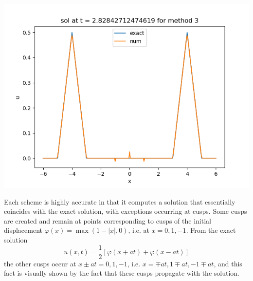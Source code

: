\documentclass{article}
\newcommand{\vp}{\varphi}
\begin{document}
\begin{enumerate}[label=(\alph*)]
\begin{center}
	\includegraphics[scale=.4]{hw11 sol n = 80 method 3}
\end{center}

Each scheme is highly accurate in that it computes a solution that essentially coincides with the exact solution, with exceptions occurring at cusps. Some cusps are created and remain at points corresponding to cusps of the initial displacement $\vp(x)=\max(1-|x|,0)$, i.e. at $x=0,1,-1$. From the exact solution
$$u(x,t) = \frac12[\vp(x+at)+\vp(x-at)]$$
the other cusps occur at $x\pm at=0,1,-1$, i.e. $x=\mp at,1\mp at,-1\mp at$, and this fact is visually shown by the fact that these cusps propagate with the solution.
	
\end{enumerate}


	
\end{document}
